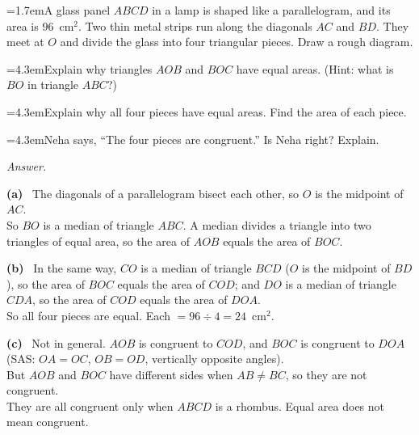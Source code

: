 \documentclass[11pt,a4paper]{article}
\newcommand{\nl}{\\[3pt]}
\newcounter{qn}
\newcommand{\ques}{\par\medskip\refstepcounter{qn}\noindent\hangindent=1.7em\hangafter=1\makebox[1.7em][l]{\textbf{\arabic{qn}.}}\ignorespaces}
\newcommand{\pc}[2]{\par\smallskip\noindent\hspace*{2em}\hangindent=4.3em\hangafter=1\makebox[2em][l]{(#1)}\hspace{0.3em}#2\par}
\newenvironment{answerblock}
  {\par\needspace{6\baselineskip}\smallskip\begingroup\small\linespread{1.2}\selectfont\color{muted}\noindent\textit{Answer.}\par}
  {\par\endgroup\medskip}
\newcommand{\ap}[1]{\par\smallskip\noindent\textbf{(#1)}\ }
\begin{document}
\ques A glass panel $ABCD$ in a lamp is shaped like a parallelogram, and its area is $96$~cm$^2$. Two thin metal strips run along the diagonals $AC$ and $BD$. They meet at $O$ and divide the glass into four triangular pieces. Draw a rough diagram.\par
\pc{a}{Explain why triangles $AOB$ and $BOC$ have equal areas. (Hint: what is $BO$ in triangle $ABC$?)}
\pc{b}{Explain why all four pieces have equal areas. Find the area of each piece.}
\pc{c}{Neha says, ``The four pieces are congruent.'' Is Neha right? Explain.}
\begin{answerblock}
\ap{a} The diagonals of a parallelogram bisect each other, so $O$ is the midpoint of $AC$.\nl
So $BO$ is a median of triangle $ABC$. A median divides a triangle into two triangles of equal area, so the area of $AOB$ equals the area of $BOC$.
\ap{b} In the same way, $CO$ is a median of triangle $BCD$ ($O$ is the midpoint of $BD$), so the area of $BOC$ equals the area of $COD$; and $DO$ is a median of triangle $CDA$, so the area of $COD$ equals the area of $DOA$.\nl
So all four pieces are equal. Each $=96\div4=24$~cm$^2$.
\ap{c} Not in general. $AOB$ is congruent to $COD$, and $BOC$ is congruent to $DOA$ (SAS: $OA=OC$, $OB=OD$, vertically opposite angles).\nl
But $AOB$ and $BOC$ have different sides when $AB\ne BC$, so they are not congruent.\nl
They are all congruent only when $ABCD$ is a rhombus. Equal area does not mean congruent.
\begin{center}
\end{center}
\end{answerblock}
\end{document}

